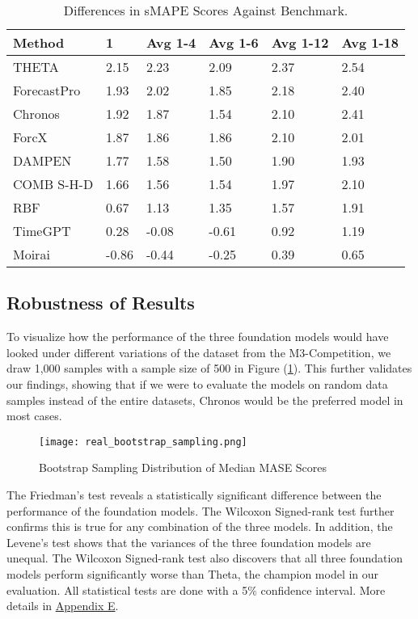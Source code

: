 \documentclass[12pt,a4paper]{article}
\begin{document}
\begin{table}[h!tbp]
  \centering
  \caption{Differences in sMAPE Scores Against Benchmark.}
  \label{smape_scores_table}
  \begin{tabular}{llllll}
  \hline
  \textbf{Method} & \textbf{1} & \textbf{Avg 1-4} & \textbf{Avg 1-6} & \textbf{Avg 1-12} & \textbf{Avg 1-18} \\ \hline
  THETA & 2.15 & 2.23 & 2.09 & 2.37 & 2.54 \\
  ForecastPro & 1.93 & 2.02 & 1.85 & 2.18 & 2.40 \\
  Chronos & 1.92 & 1.87 & 1.54 & 2.10 & 2.41 \\
  ForcX & 1.87 & 1.86 & 1.86 & 2.10 & 2.01 \\
  DAMPEN & 1.77 & 1.58 & 1.50 & 1.90 & 1.93 \\
  COMB S-H-D & 1.66 & 1.56 & 1.54 & 1.97 & 2.10 \\
  RBF & 0.67 & 1.13 & 1.35 & 1.57 & 1.91 \\
  TimeGPT & 0.28 & -0.08 & -0.61 & 0.92 & 1.19 \\
  Moirai & -0.86 & -0.44 & -0.25 & 0.39 & 0.65 \\ \hline
  \end{tabular}
\end{table}

\subsection{Robustness of Results} \label{robustness}

To visualize how the performance of the three foundation models would have looked under different variations of the dataset from the M3-Competition, we draw 1,000 samples with a sample size of 500 in Figure (\ref{mase_sampling_distribution}). This further validates our findings, showing that if we were to evaluate the models on random data samples instead of the entire datasets, Chronos would be the preferred model in most cases.

\begin{figure}[htbp]
  \centering
  \texttt{[image: real\_bootstrap\_sampling.png]}
  \caption{Bootstrap Sampling Distribution of Median MASE Scores}
  \label{mase_sampling_distribution}
\end{figure}

The Friedman’s test reveals a statistically significant difference between the performance of the foundation models. The Wilcoxon Signed-rank test further confirms this is true for any combination of the three models. In addition, the Levene’s test shows that the variances of the three foundation models are unequal. The Wilcoxon Signed-rank test also discovers that all three foundation models perform significantly worse than Theta, the champion model in our evaluation. All statistical tests are done with a 5\% confidence interval. More details in \hyperref[appendix_e]{Appendix E}.
\end{document}
